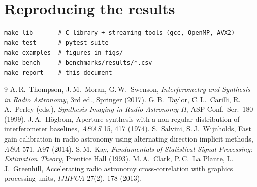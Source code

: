 \documentclass[11pt,a4paper]{article}
\begin{document}
\section{Reproducing the results}
\begin{lstlisting}
make lib       # C library + streaming tools (gcc, OpenMP, AVX2)
make test      # pytest suite
make examples  # figures in figs/
make bench     # benchmarks/results/*.csv
make report    # this document
\end{lstlisting}

\begin{thebibliography}{9}\small
{} A.\,R.~Thompson, J.\,M.~Moran, G.\,W.~Swenson, \emph{Interferometry and Synthesis in
Radio Astronomy}, 3rd ed., Springer (2017).
 G.\,B.~Taylor, C.\,L.~Carilli, R.\,A.~Perley (eds.), \emph{Synthesis Imaging in Radio
Astronomy II}, ASP Conf.\ Ser.\ 180 (1999).
 J.\,A.~Högbom, Aperture synthesis with a non-regular distribution of interferometer
baselines, \emph{A\&AS} 15, 417 (1974).
 S.~Salvini, S.\,J.~Wijnholds, Fast gain calibration in radio astronomy using
alternating direction implicit methods, \emph{A\&A} 571, A97 (2014).
 S.\,M.~Kay, \emph{Fundamentals of Statistical Signal Processing: Estimation Theory},
Prentice Hall (1993).
 M.\,A.~Clark, P.\,C.~La Plante, L.\,J.~Greenhill, Accelerating radio astronomy
cross-correlation with graphics processing units, \emph{IJHPCA} 27(2), 178 (2013).
\end{thebibliography}
\end{document}
